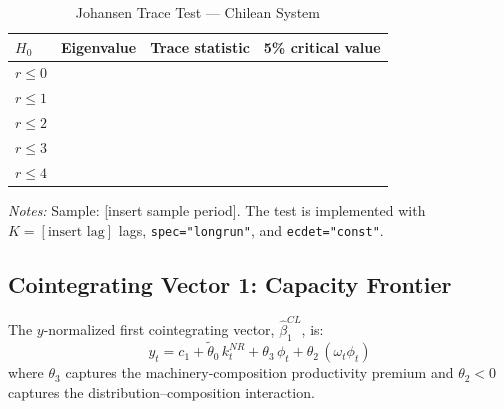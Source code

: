 \begin{table}[htbp]
	\centering
	\caption{Johansen Trace Test --- Chilean System}
	\label{tab:cl:sa:trace}
	\begin{threeparttable}
		\begin{tabular}{lccc}
			\toprule
			$H_0$ & Eigenvalue & Trace statistic & 5\% critical value \\
			\midrule
			$r \leq 0$ &  &  &  \\
			$r \leq 1$ &  &  &  \\
			$r \leq 2$ &  &  &  \\
			$r \leq 3$ &  &  &  \\
			$r \leq 4$ &  &  &  \\
			\bottomrule
		\end{tabular}
		\begin{tablenotes}
			\small
			\item \textit{Notes:} Sample: [insert sample period]. The test is
			implemented with $K = [\text{insert lag}]$ lags,
			\texttt{spec="longrun"}, and \texttt{ecdet="const"}.
		\end{tablenotes}
	\end{threeparttable}
\end{table}

\subsection{Cointegrating Vector 1: Capacity Frontier}
\label{app:cl:cv1}

The $y$-normalized first cointegrating vector, $\hat{\beta}_1^{CL}$, is:
%
\begin{equation}
	y_t
	= c_1 + \tilde{\theta}_0\, k_t^{NR}
	+ \theta_3\, \phi_t
	+ \theta_2\, (\omega_t \phi_t)
	\label{eq:cl:sa:cv1}
\end{equation}
%
where $\theta_3$ captures the machinery-composition productivity premium
and $\theta_2 < 0$ captures the distribution--composition interaction.

